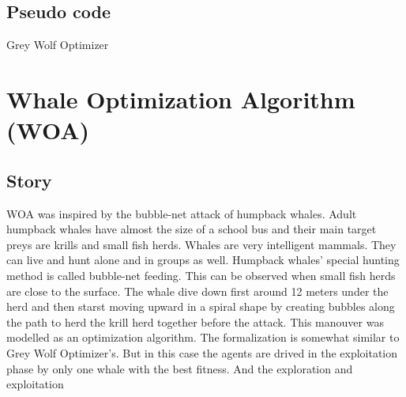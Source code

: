 \documentclass[border=0.2cm]{report}
\begin{document}
\section{Pseudo code}

\begin{algorithm}[H]
\caption{Grey Wolf Optimizer}
 
\end{algorithm}


\chapter{Whale Optimization Algorithm (WOA)}
\section{Story}

WOA \cite{woa1} was inspired by the bubble-net attack of humpback whales. Adult humpback whales have almost the size of a school bus and their main target preys are krills and small fish herds. Whales are very intelligent mammals. They can live and hunt alone and in groups as well. Humpback whales' special hunting method is called bubble-net feeding. This can be observed when small fish herds are close to the surface. The whale dive down first around 12 meters under the herd and then starst moving upward in a spiral shape by creating bubbles along the path to herd the krill herd together before the attack. This manouver was modelled as an optimization algorithm. The formalization is somewhat similar to Grey Wolf Optimizer's. But in this case the agents are drived in the exploitation phase by only one whale with the best fitness. And the exploration and exploitation
\end{document}
